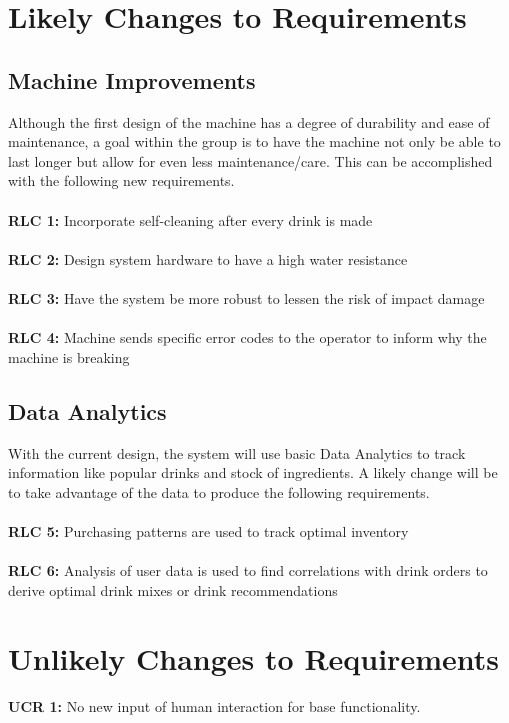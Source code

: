 \documentclass{article}
\begin{document}
\section{Likely Changes to Requirements}
\subsection{Machine Improvements}
    \noindent Although the first design of the machine has a degree of durability and ease of maintenance, a goal within the group is to have the machine not only be able to last longer but allow for even less maintenance/care. This can be accomplished with the following new requirements. \\\\
    \textbf{RLC 1:} Incorporate self-cleaning after every drink is made\\\\
    \textbf{RLC 2:} Design system hardware to have a high water resistance\\\\
    \textbf{RLC 3:} Have the system be more robust to lessen the risk of impact damage\\\\
    \textbf{RLC 4:} Machine sends specific error codes to the operator to inform why the machine is breaking\\
\subsection{Data Analytics}
    \noindent With the current design, the system will use basic Data Analytics to track information like popular drinks and stock of ingredients. A likely change will be to take advantage of the data to produce the following requirements. \\\\
    \textbf{RLC 5:} Purchasing patterns are used to track optimal inventory \\\\
    \textbf{RLC 6:} Analysis of user data is used to find correlations with drink orders to derive optimal drink mixes or drink recommendations\\

\section{Unlikely Changes to Requirements}
    \noindent\textbf{UCR 1:} No new input of human interaction for base functionality. \\
\end{document}
